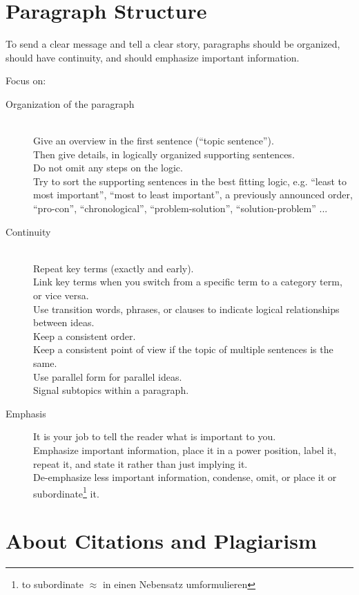 \section{Paragraph Structure}

To send a clear message and tell a clear story, paragraphs should be organized, should have continuity, and should emphasize important information.

Focus on:
\begin{description}
	\item[Organization of the paragraph] \hfill \\
		Give an overview in the first sentence (``topic sentence''). \hfill \\
		Then give details, in logically organized supporting sentences. \hfill \\
		Do not omit any steps on the logic. \hfill \\
		Try to sort the supporting sentences in the best fitting logic, e.g.  ``least to most important'', ``most to least important'', a previously announced order, ``pro-con'', ``chronological'', ``problem-solution'', ``solution-problem'' ... 
	\item[Continuity] \hfill \\
		Repeat key terms (exactly and early).\hfill \\
		Link key terms when you switch from a specific term to a category term, or vice versa.\hfill \\
		Use transition words, phrases, or clauses to indicate logical relationships between ideas.\hfill \\
		Keep a consistent order.\hfill \\
		Keep a consistent point of view if the topic of multiple sentences is the same.\hfill \\
		Use parallel form for parallel ideas. \hfill \\
		Signal subtopics within a paragraph.
	\item[Emphasis]
		It is your job to tell the reader what is important to you. \hfill \\
		Emphasize important information, place it in a power position, label it, repeat it, and state it rather than just implying it.  \hfill \\
		De-emphasize less important information, condense, omit, or place it or subordinate\footnote{to subordinate $\approx$ in einen Nebensatz umformulieren} it.
\end{description}

\section{About Citations and Plagiarism}\label{AboutPlagiarism}

